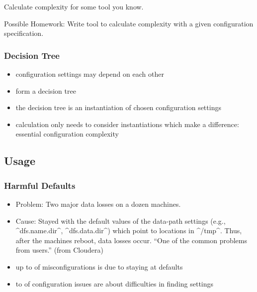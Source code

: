 \begin{assignment}
	\begin{task}
	Calculate complexity for some tool you know.
	\end{task}

	\begin{task}
	Possible Homework: Write tool to calculate complexity with a given configuration specification.
	\end{task}
\end{assignment}

\begin{frame}
	\frametitle{Decision Tree}
	\begin{itemize}
	\item configuration settings may depend on each other
	\item form a decision tree~\cite{reiser2009cvm,czarnecki2012cool}
	\item the decision tree is an instantiation of chosen configuration settings
	\item calculation only needs to consider instantiations which make a difference: \\
	essential configuration complexity~\cite{meinicke2016essential}
	\end{itemize}
\end{frame}

\subsection{Usage}

\begin{frame}[fragile]
	\frametitle{Harmful Defaults~\cite{xu2015hey}}
	\begin{itemize}
	\item Problem: Two major data losses on a dozen machines.
	\item Cause:
	Stayed with the default values of the data-path settings
	(e.g., ^dfs.name.dir^, ^dfs.data.dir^) which point to locations in ^/tmp^.
	Thus, after the machines reboot, data losses occur.
	``One of the common problems from users.'' (from Cloudera)
	\item up to  of misconfigurations is due to staying at defaults
	\item {} to  of configuration issues are about difficulties in finding settings
	\end{itemize}
\end{frame}

